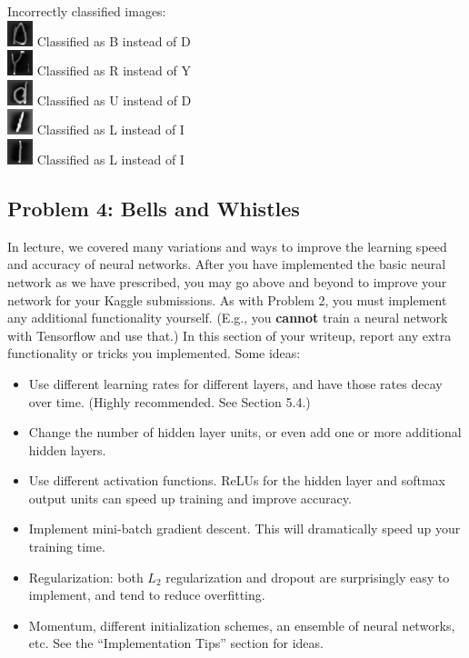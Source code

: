 \documentclass{article}
\begin{document}
Incorrectly classified images:\\
\includegraphics[scale=1]{wrong0.png} Classified as B instead of D\\
\includegraphics[scale=1]{wrong1.png} Classified as R instead of Y\\
\includegraphics[scale=1]{wrong2.png} Classified as U instead of D\\
\includegraphics[scale=1]{wrong3.png} Classified as L instead of I\\
\includegraphics[scale=1]{wrong4.png} Classified as L instead of I\\

\newpage
\subsection*{Problem 4: Bells and Whistles}
In lecture, we covered many variations and ways to improve the learning speed and accuracy of neural networks. After you have implemented the basic neural network as we have prescribed, you may go above and beyond to improve your network for your Kaggle submissions. As with Problem 2, you must implement any additional functionality yourself. (E.g., you \textbf{cannot} train a neural network with Tensorflow and use that.) In this section of your writeup, report any extra functionality or tricks you implemented. Some ideas:
    
\begin{itemize}
    \item Use different learning rates for different layers, and have those rates decay over time. (Highly recommended. See Section 5.4.)
    \item Change the number of hidden layer units, or even add one or more additional hidden layers.
    \item Use different activation functions. ReLUs for the hidden layer and softmax output units can speed up training and improve accuracy.
    \item Implement mini-batch gradient descent. This will dramatically speed up your training time.
    \item Regularization: both $L_2$ regularization and dropout are surprisingly easy to implement, and tend to reduce overfitting.
    \item Momentum, different initialization schemes, an ensemble of neural networks, etc. See the “Implementation Tips” section for ideas.
\end{itemize}
    
\end{document}
